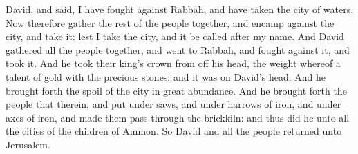 {David, and
said, I have
fought against
Rabbah, and have
taken the
city of
waters.
Now therefore
gather the
rest of the
people
together, and
encamp against the
city, and
take it: lest I
take the
city, and it be
called after my
name.
And
David
gathered all the
people
together, and
went to
Rabbah, and
fought against it, and
took it.
And he
took their
king’s
crown from off his
head, the
weight whereof
{} a
talent of
gold with the
precious
stones: and it was
{} on
David’s
head. And he brought
forth the
spoil of the
city in
great
abundance.
And he brought
forth the
people that
{} therein, and
put
{} under
saws, and under
harrows of
iron, and under
axes of
iron, and made them
pass through the
brickkiln: and thus
did he unto all the
cities of the
children of
Ammon. So
David and all the
people
returned unto
Jerusalem.

}
